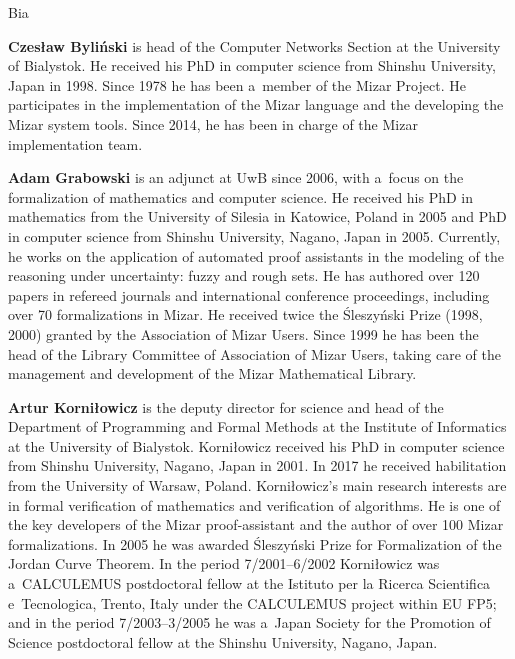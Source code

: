 \begin{sitedescription}{Bia}
\begin{compactitem}
\item\textbf{Czesław Byliński} is head of the Computer Networks Section at the University of Bialystok.
He received his PhD in computer science from Shinshu University, Japan in 1998.
Since 1978 he has been a~member of the Mizar Project.
He participates in the implementation of the Mizar language and the developing the Mizar system tools. 
Since 2014, he has been in charge of the Mizar implementation team.

\item\textbf{Adam Grabowski} is an adjunct at UwB since 2006, 
with a~focus on the formalization of mathematics and computer science.
He received his PhD in mathematics from the University of Silesia in Katowice, Poland in 2005 
and PhD in computer science from Shinshu University, Nagano, Japan in 2005.
Currently, he works on the application of automated proof assistants
in the modeling of the reasoning under uncertainty: fuzzy and rough sets.
He has authored over 120 papers in refereed journals and international conference
proceedings, including over 70 formalizations in Mizar.
He received twice the Śleszyński Prize (1998, 2000) granted by the Association of Mizar Users.
Since 1999 he has been the head of the Library Committee of Association of Mizar Users, taking care of
the management and development of the Mizar Mathematical Library.

\item\textbf{Artur Korniłowicz} is the deputy director for science 
and head of the Department of Programming and Formal Methods
at the Institute of Informatics at the University of Bialystok.
Korniłowicz received his PhD in computer science from Shinshu University, Nagano, Japan in 2001.
In 2017 he received habilitation from the University of Warsaw, Poland.
Korniłowicz's main research interests are in formal verification of mathematics and verification of algorithms.
He is one of the key developers of the Mizar proof-assistant and the author of over 100 Mizar formalizations.
In 2005 he was awarded Śleszyński Prize for Formalization of the Jordan Curve Theorem.
In the period 7/2001--6/2002 Korniłowicz was a~CALCULEMUS postdoctoral fellow
at the Istituto per la Ricerca Scientifica e~Tecnologica, Trento, Italy under the CALCULEMUS project within EU FP5;
and in the period 7/2003--3/2005 he was a~Japan Society for the Promotion of Science 
postdoctoral fellow at the Shinshu University, Nagano, Japan.


\end{compactitem}
\end{sitedescription}
